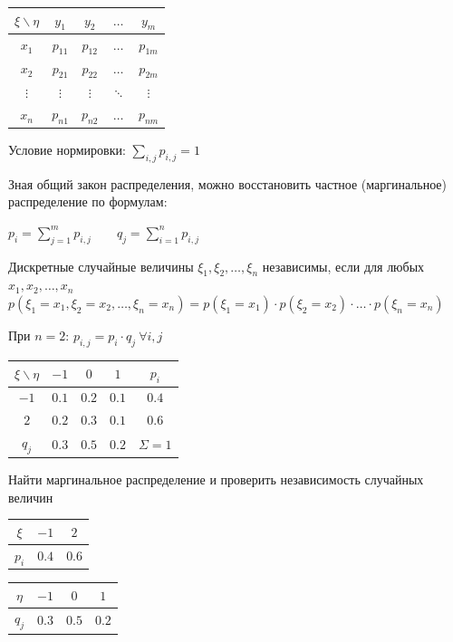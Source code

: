 \documentclass[12pt]{article}
\begin{document}
    \begin{tabular}{c|c|c|c|c}
        $\xi \backslash \eta$ & $y_1$ & $y_2$ & $\dots$ & $y_m$ \\
        \hline
        $x_1$ & $p_{11}$ & $p_{12}$ & $\dots$ & $p_{1m}$ \\
        \hline
        $x_2$ & $p_{21}$ & $p_{22}$ & $\dots$ & $p_{2m}$ \\
        \hline
        $\vdots$ & $\vdots$ & $\vdots$ & $\ddots$ & $\vdots$ \\
        \hline
        $x_n$ & $p_{n1}$ & $p_{n2}$ & $\dots$ & $p_{nm}$ \\
    \end{tabular}

    Условие нормировки: $\sum_{i, j} p_{i, j} = 1$

    Зная общий закон распределения, можно восстановить частное (маргинальное) распределение по формулам: 

    $p_i = \sum_{j = 1}^m p_{i, j} \qquad q_j = \sum_{i = 1}^n p_{i, j}$

    \Def Дискретные случайные величины $\xi_1, \xi_2, \dots, \xi_n$ независимы, если для любых $x_1, x_2, \dots, x_n$ 
    $p(\xi_1 = x_1, \xi_2 = x_2, \dots, \xi_n = x_n) = p(\xi_1 = x_1) \cdot p(\xi_2 = x_2) \cdot \dots \cdot p(\xi_n = x_n)$

    При $n = 2$: $p_{i, j} = p_i \cdot q_j \ \forall i, j$

    \Ex

    \begin{tabular}{c|c|c|c|c}
        $\xi \backslash \eta$ & $-1$ & $0$ & $1$ & $p_i$ \\
        \hline
        $-1$ & $0.1$ & $0.2$ & $0.1$ & $0.4$ \\
        \hline
        $2$ & $0.2$ & $0.3$ & $0.1$ & $0.6$ \\
        \hline
        $q_j$ & $0.3$ & $0.5$ & $0.2$ & $\Sigma = 1$ \\
    \end{tabular}

    Найти маргинальное распределение и проверить независимость случайных величин


    \begin{tabular}{c|c|c}
        $\xi$ & $-1$ & $2$ \\
        \hline
        $p_i$ & $0.4$ & $0.6$  \\
    \end{tabular}

    \begin{tabular}{c|c|c|c}
        $\eta$ & $-1$ & $0$ & $1$ \\
        \hline
        $q_j$ & $0.3$ & $0.5$ & $0.2$  \\
    \end{tabular}
\end{document}

